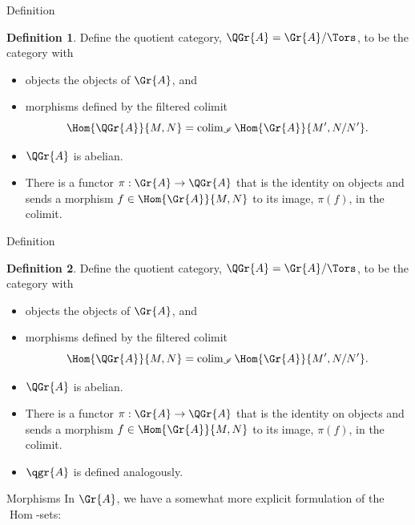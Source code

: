 \documentclass{beamer}
\theoremstyle{definition}
\newtheorem{defn}{Definition}
\begin{document}
\begin{frame}[fragile]{Definition}
  \setcounter{defn}{1}
  \begin{defn}
    Define the quotient category, $\QGr{A} = \Gr{A}/\Tors$, to be the category with
    \begin{itemize}
    \item
      objects the objects of $\Gr{A}$, and
    \item
      morphisms defined by the filtered colimit
      $$\Hom{\QGr{A}}{M,N} = \operatorname{colim}_{\mathscr{I}} \Hom{\Gr{A}}{M^\prime, N/N^\prime}.$$
    \end{itemize}
  \end{defn}
  \begin{itemize}
  \item
    $\QGr{A}$ is abelian.
  \item
    There is a functor $\pi : \Gr{A} \rightarrow \QGr{A}$ that is the identity on objects and sends a morphism $f \in \Hom{\Gr{A}}{M,N}$ to its image, $\pi(f)$, in the colimit.
  \end{itemize}
\end{frame}

\begin{frame}[fragile]{Definition}
  \setcounter{defn}{1}
  \begin{defn}
    Define the quotient category, $\QGr{A} = \Gr{A}/\Tors$, to be the category with
    \begin{itemize}
    \item
      objects the objects of $\Gr{A}$, and
    \item
      morphisms defined by the filtered colimit
      $$\Hom{\QGr{A}}{M,N} = \operatorname{colim}_{\mathscr{I}} \Hom{\Gr{A}}{M^\prime, N/N^\prime}.$$
    \end{itemize}
  \end{defn}
  \begin{itemize}
  \item
    $\QGr{A}$ is abelian.
  \item
    There is a functor $\pi : \Gr{A} \rightarrow \QGr{A}$ that is the identity on objects and sends a morphism $f \in \Hom{\Gr{A}}{M,N}$ to its image, $\pi(f)$, in the colimit.
  \item
    $\qgr{A}$ is defined analogously.
  \end{itemize}
\end{frame}

\begin{frame}{Morphisms}
  In $\Gr{A}$, we have a somewhat more explicit formulation of the $\operatorname{Hom}$-sets:
\end{frame}
\end{document}
